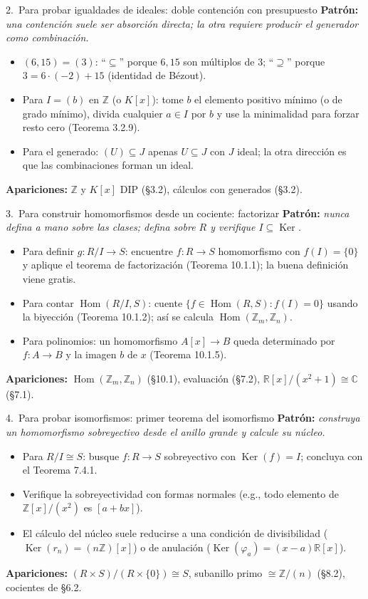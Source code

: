 \documentclass[11pt,twoside]{article}
\DeclareMathOperator{\Ker}{Ker}
\DeclareMathOperator{\Hom}{Hom}
\newcommand{\Z}{\mathbb{Z}}
\newcommand{\R}{\mathbb{R}}
\newcommand{\C}{\mathbb{C}}
\begin{document}
\begin{strategybox}{2.\ Para probar igualdades de ideales: doble contención con presupuesto}
\textbf{Patrón:} \textit{una contención suele ser absorción directa; la otra requiere producir el generador como combinación.}
\begin{itemize}[leftmargin=1.5em]
\item $(6, 15) = (3)$: ``$\subseteq$'' porque $6, 15$ son múltiplos de $3$; ``$\supseteq$'' porque $3 = 6 \cdot (-2) + 15$ (identidad de Bézout).
\item Para $I = (b)$ en $\Z$ (o $K[x]$): tome $b$ el elemento positivo mínimo (o de grado mínimo), divida cualquier $a \in I$ por $b$ y use la minimalidad para forzar resto cero (Teorema 3.2.9).
\item Para el generado: $(U) \subseteq J$ apenas $U \subseteq J$ con $J$ ideal; la otra dirección es que las combinaciones forman un ideal.
\end{itemize}
\textbf{Apariciones:} $\Z$ y $K[x]$ DIP (§3.2), cálculos con generados (§3.2).
\end{strategybox}

\begin{strategybox}{3.\ Para construir homomorfismos desde un cociente: factorizar}
\textbf{Patrón:} \textit{nunca defina a mano sobre las clases; defina sobre $R$ y verifique $I \subseteq \Ker$.}
\begin{itemize}[leftmargin=1.5em]
\item Para definir $g : R/I \to S$: encuentre $f : R \to S$ homomorfismo con $f(I) = \{0\}$ y aplique el teorema de factorización (Teorema 10.1.1); la buena definición viene gratis.
\item Para contar $\Hom(R/I, S)$: cuente $\{f \in \Hom(R, S) : f(I) = 0\}$ usando la biyección (Teorema 10.1.2); así se calcula $\Hom(\Z_{m}, \Z_{n})$.
\item Para polinomios: un homomorfismo $A[x] \to B$ queda determinado por $f : A \to B$ y la imagen $b$ de $x$ (Teorema 10.1.5).
\end{itemize}
\textbf{Apariciones:} $\Hom(\Z_{m}, \Z_{n})$ (§10.1), evaluación (§7.2), $\R[x]/(x^{2}+1) \cong \C$ (§7.1).
\end{strategybox}

\begin{strategybox}{4.\ Para probar isomorfismos: primer teorema del isomorfismo}
\textbf{Patrón:} \textit{construya un homomorfismo sobreyectivo desde el anillo grande y calcule su núcleo.}
\begin{itemize}[leftmargin=1.5em]
\item Para $R/I \cong S$: busque $f : R \to S$ sobreyectivo con $\Ker(f) = I$; concluya con el Teorema 7.4.1.
\item Verifique la sobreyectividad con formas normales (e.g., todo elemento de $\Z[x]/(x^{2})$ es $[a+bx]$).
\item El cálculo del núcleo suele reducirse a una condición de divisibilidad ($\Ker(r_{n}) = (n\Z)[x]$) o de anulación ($\Ker(\varphi_{a}) = (x - a)\R[x]$).
\end{itemize}
\textbf{Apariciones:} $(R \times S)/(R \times \{0\}) \cong S$, subanillo primo $\cong \Z/(n)$ (§8.2), cocientes de §6.2.
\end{strategybox}
\end{document}
